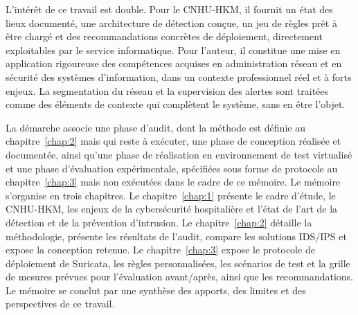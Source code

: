 L'intérêt de ce travail est double. Pour le CNHU-HKM, il fournit un état des lieux documenté, une architecture de détection conçue, un jeu de règles prêt à être chargé et des recommandations concrètes de déploiement, directement exploitables par le service informatique. Pour l'auteur, il constitue une mise en application rigoureuse des compétences acquises en administration réseau et en sécurité des systèmes d'information, dans un contexte professionnel réel et à forts enjeux. La segmentation du réseau et la supervision des alertes sont traitées comme des éléments de contexte qui complètent le système, sans en être l'objet.

La démarche associe une phase d'audit, dont la méthode est définie au chapitre~\ref{chap:2} mais qui reste à exécuter, une phase de conception réalisée et documentée, ainsi qu'une phase de réalisation en environnement de test virtualisé et une phase d'évaluation expérimentale, spécifiées sous forme de protocole au chapitre~\ref{chap:3} mais non exécutées dans le cadre de ce mémoire. Le mémoire s'organise en trois chapitres. Le chapitre~\ref{chap:1} présente le cadre d'étude, le CNHU-HKM, les enjeux de la cybersécurité hospitalière et l'état de l'art de la détection et de la prévention d'intrusion. Le chapitre~\ref{chap:2} détaille la méthodologie, présente les résultats de l'audit, compare les solutions IDS/IPS et expose la conception retenue. Le chapitre~\ref{chap:3} expose le protocole de déploiement de Suricata, les règles personnalisées, les scénarios de test et la grille de mesures prévues pour l'évaluation avant/après, ainsi que les recommandations. Le mémoire se conclut par une synthèse des apports, des limites et des perspectives de ce travail.
